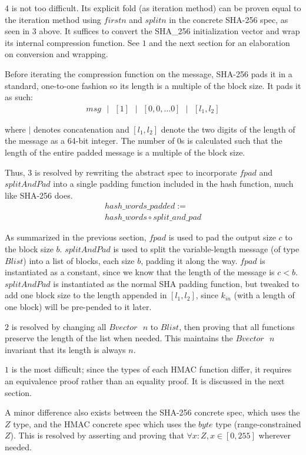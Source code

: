 \documentclass[twocolumn,showpacs,%
  nofootinbib,aps,superscriptaddress,%
  eqsecnum,prd,notitlepage,showkeys,10pt]{revtex4-1}
\newcommand{\eqn}[1] {\begin{gather*}#1\end{gather*}}
\newcommand{\s} {\textrm{ }}
\begin{document}
$4$ is not too difficult. Its explicit fold (as iteration method) can be proven equal to the iteration method using $firstn$ and $splitn$ in the concrete SHA-256 spec, as seen in $3$ above. It suffices to convert the SHA\_256 initialization vector and wrap its internal compression function. See $1$ and the next section for an elaboration on conversion and wrapping.

Before iterating the compression function on the message, SHA-256 pads it in a standard, one-to-one fashion so its length is a multiple of the block size. It pads it as such:
\eqn{msg\s | \s [1] \s | \s [0, 0, \ldots 0] \s | \s [l_1, l_2]}

where $|$ denotes concatenation and $[l_1, l_2]$ denote the two digits of the length of the message as a 64-bit integer. The number of $0$s is calculated such that the length of the entire padded message is a multiple of the block size. 

 Thus, $3$ is resolved by rewriting the abstract spec to incorporate $fpad$ and $splitAndPad$ into a single padding function included in the hash function, much like SHA-256 does.
\eqn{ hash\_words\_padded := \\ hash\_words \circ split\_and\_pad}

As summarized in the previous section, $fpad$ is used to pad the output size $c$ to the block size $b$. $splitAndPad$ is used to split the variable-length message (of type $Blist$) into a list of blocks, each size $b$, padding it along the way. $fpad$ is instantiated as a constant, since we know that the length of the message is $c < b$. $splitAndPad$ is instantiated as the normal SHA padding function, but tweaked to add one block size to the length appended in $[l_1, l_2]$, since $k_{in}$ (with a length of one block) will be pre-pended to it later.

$2$ is resolved by changing all $Bvector \s n$ to $Blist$, then proving that all functions preserve the length of the list when needed. This maintains the $Bvector \s n$ invariant that its length is always $n$.

$1$ is the most difficult; since the types of each HMAC function differ, it requires an equivalence proof rather than an equality proof. It is discussed in the next section. 

A minor difference also exists between the SHA-256 concrete spec, which uses the $Z$ type, and the HMAC concrete spec which uses the $byte$ type (range-constrained $Z$). This is resolved by asserting and proving that $\forall x:Z, x \in [0, 255]$ wherever needed.
\end{document}
